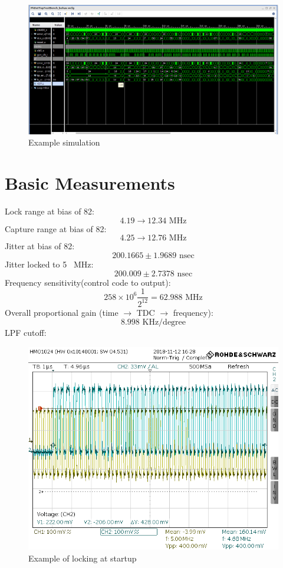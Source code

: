 \documentclass[a4paper,12pt]{report}
\begin{document}
\begin{figure}[h]
    \centering
    \includegraphics[scale=0.33]{../good_sim}
    \caption{Example simulation}
    \label{fig:example_sim}
\end{figure}

\section*{Basic Measurements}
Lock range at bias of 82:
$$4.19\rightarrow12.34\textrm{ MHz} $$ 
Capture range at bias of 82:
$$4.25\rightarrow12.76\textrm{ MHz}  $$
Jitter at bias of 82:\\
$$ 200.1665\pm1.9689\textrm{ nsec} $$
Jitter locked to 5~ MHz:\\
$$ 200.009\pm2.7378\textrm{ nsec} $$
Frequency sensitivity(control code to output):
$$ 258\times10^6\frac{1}{2^{12}}=62.988\textrm{ MHz} $$
Overall proportional gain (time $\rightarrow$ TDC $\rightarrow$ frequency):
$$ 8.998 \textrm{ KHz/degree} $$
LPF cutoff:\\

\begin{figure}[h]
    \centering
    \includegraphics[scale=0.33]{../HMO_locking_4M7_to5M0}
    \caption{Example of locking at startup}
    \label{fig:hmo_locking}
\end{figure}%
\end{document}
